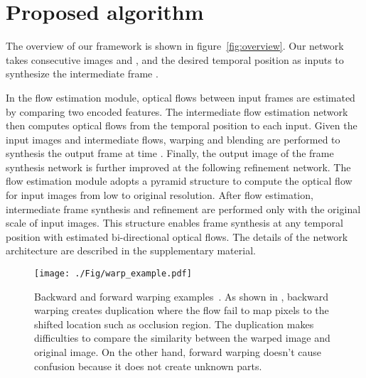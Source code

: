 \documentclass[10pt,twocolumn,letterpaper]{article}
\begin{document}
\section{Proposed algorithm}
The overview of our framework is shown in figure~\ref{fig:overview}. 
Our network takes consecutive images  and , and the desired temporal position  as inputs to synthesize the intermediate frame . 

In the flow estimation module, optical flows between input frames are estimated by comparing two encoded features.
The intermediate flow estimation network then computes optical flows from the temporal position  to each input. 
Given the input images and intermediate flows, warping and blending are performed to synthesis the output frame at time . 
Finally, the output image of the frame synthesis network is further improved at the following refinement network.
The flow estimation module adopts a pyramid structure to compute the optical flow for input images from low to original resolution.
After flow estimation, intermediate frame synthesis and refinement are  performed only with the original scale of input images. 
This structure enables frame synthesis at any temporal position with estimated bi-directional optical flows.
The details of the network architecture are described in the supplementary material.

\begin{figure}
\centering
\texttt{[image: ./Fig/warp\_example.pdf]}
\caption{Backward and forward warping examples~\cite{baker2011database}. As shown in , backward warping creates duplication where the flow fail to map pixels to the shifted location such as occlusion region. The duplication makes difficulties to compare the similarity between the warped image and original image. On the other hand, forward warping doesn't cause confusion because it does not create unknown parts.}
\label{fig:warp_example}
\end{figure}
\end{document}
